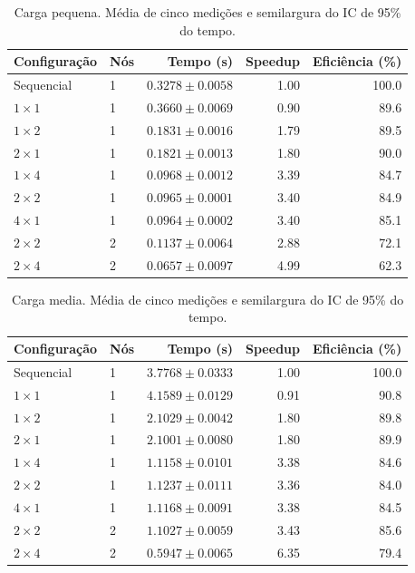 \begin{table}[htbp]
\centering
\caption{Carga pequena. Média de cinco medições e semilargura do IC de 95\% do tempo.}
\label{tab:lasdpc-pequena}
\begin{tabular}{llrrr}
\toprule
Configuração & Nós & Tempo (s) & Speedup & Eficiência (\%) \\
\midrule
Sequencial & 1 & $0.3278 \pm 0.0058$ & 1.00 & 100.0 \\
$1 \times 1$ & 1 & $0.3660 \pm 0.0069$ & 0.90 & 89.6 \\
$1 \times 2$ & 1 & $0.1831 \pm 0.0016$ & 1.79 & 89.5 \\
$2 \times 1$ & 1 & $0.1821 \pm 0.0013$ & 1.80 & 90.0 \\
$1 \times 4$ & 1 & $0.0968 \pm 0.0012$ & 3.39 & 84.7 \\
$2 \times 2$ & 1 & $0.0965 \pm 0.0001$ & 3.40 & 84.9 \\
$4 \times 1$ & 1 & $0.0964 \pm 0.0002$ & 3.40 & 85.1 \\
$2 \times 2$ & 2 & $0.1137 \pm 0.0064$ & 2.88 & 72.1 \\
$2 \times 4$ & 2 & $0.0657 \pm 0.0097$ & 4.99 & 62.3 \\
\bottomrule
\end{tabular}
\end{table}

\begin{table}[htbp]
\centering
\caption{Carga media. Média de cinco medições e semilargura do IC de 95\% do tempo.}
\label{tab:lasdpc-media}
\begin{tabular}{llrrr}
\toprule
Configuração & Nós & Tempo (s) & Speedup & Eficiência (\%) \\
\midrule
Sequencial & 1 & $3.7768 \pm 0.0333$ & 1.00 & 100.0 \\
$1 \times 1$ & 1 & $4.1589 \pm 0.0129$ & 0.91 & 90.8 \\
$1 \times 2$ & 1 & $2.1029 \pm 0.0042$ & 1.80 & 89.8 \\
$2 \times 1$ & 1 & $2.1001 \pm 0.0080$ & 1.80 & 89.9 \\
$1 \times 4$ & 1 & $1.1158 \pm 0.0101$ & 3.38 & 84.6 \\
$2 \times 2$ & 1 & $1.1237 \pm 0.0111$ & 3.36 & 84.0 \\
$4 \times 1$ & 1 & $1.1168 \pm 0.0091$ & 3.38 & 84.5 \\
$2 \times 2$ & 2 & $1.1027 \pm 0.0059$ & 3.43 & 85.6 \\
$2 \times 4$ & 2 & $0.5947 \pm 0.0065$ & 6.35 & 79.4 \\
\bottomrule
\end{tabular}
\end{table}

